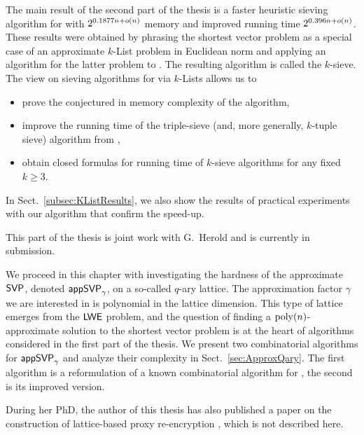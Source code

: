 The main result of the second part of the thesis is a faster heuristic sieving algorithm for \SVP with $2^{0.1877n + o(n)}$ memory and improved running time $2^{0.396n+ o(n)}$. These results were obtained by phrasing the shortest vector problem as a special case of an approximate $k$-List problem in Euclidean norm and applying an algorithm for the latter problem to \SVP. The resulting algorithm is called the $k$-sieve. The view on sieving algorithms for \SVP via $k$-Lists allows us to
	\begin{itemize}
		\item prove the conjectured in \cite{BLS16} memory complexity of the algorithm,
		\item improve the running time of the triple-sieve (and, more generally, $k$-tuple sieve) algorithm from \cite{BLS16}, 
		\item obtain closed formulas for running time of $k$-sieve algorithms for any fixed $k \geq 3$. 
	\end{itemize}


In Sect.~\ref{subsec:KListResults}, we also show the results of practical experiments with our algorithm that confirm the speed-up. 

This part of the thesis is joint work with G.\ Herold and is currently in submission.

\vspace{7pt}

We proceed in this chapter with investigating the hardness of the approximate $\textsf{SVP}$, denoted $\textsf{appSVP}_{\gamma}$, on a so-called $q$-ary lattice. The approximation factor $\gamma$ we are interested in is polynomial in the lattice dimension. This type of lattice emerges from the $\textsf{LWE}$ problem, and the question of finding a $\mathrm{poly}(n)$-approximate solution to the shortest vector problem is at the heart of algorithms considered in the first part of the thesis. We present two combinatorial algorithms for $\textsf{appSVP}_{\gamma}$ and analyze their complexity in Sect.~\ref{sec:ApproxQary}. The first algorithm is a reformulation of a known combinatorial algorithm for \LWE, the second is its improved version. %

\vspace{7pt}

During her PhD, the author of this thesis has also published a paper on the construction of lattice-based proxy re-encryption \cite{PKC:Kirshanova14}, which is not described here.  